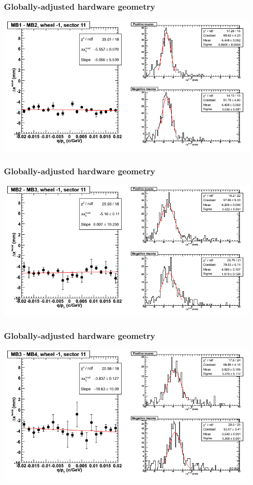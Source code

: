 \documentclass[compress]{beamer}
\begin{document}
\begin{frame}
\frametitle{Globally-adjusted hardware geometry}
\includegraphics[width=\linewidth]{NOV4_segdiffs_HW/dt13_resid_B_11_12.png}
\end{frame}

\begin{frame}
\frametitle{Globally-adjusted hardware geometry}
\includegraphics[width=\linewidth]{NOV4_segdiffs_HW/dt13_resid_B_11_23.png}
\end{frame}

\begin{frame}
\frametitle{Globally-adjusted hardware geometry}
\includegraphics[width=\linewidth]{NOV4_segdiffs_HW/dt13_resid_B_11_34.png}
\end{frame}
\end{document}
